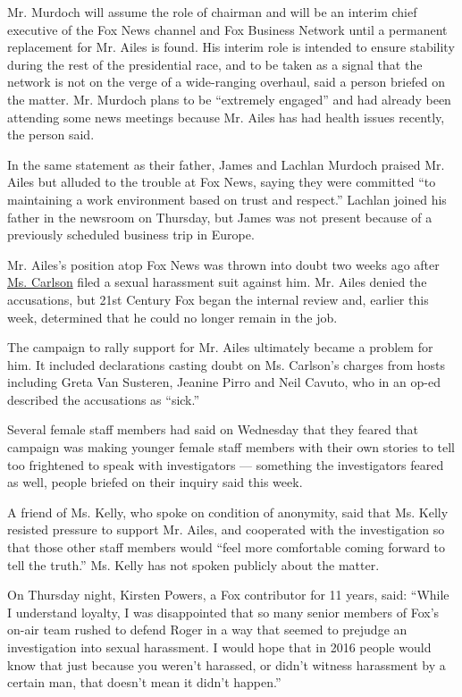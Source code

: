 Mr. Murdoch will assume the role of chairman and will be an interim
chief executive of the Fox News channel and Fox Business Network until a
permanent replacement for Mr. Ailes is found. His interim role is
intended to ensure stability during the rest of the presidential race,
and to be taken as a signal that the network is not on the verge of a
wide-ranging overhaul, said a person briefed on the matter. Mr. Murdoch
plans to be ``extremely engaged'' and had already been attending some
news meetings because Mr. Ailes has had health issues recently, the
person said.

In the same statement as their father, James and Lachlan Murdoch praised
Mr. Ailes but alluded to the trouble at Fox News, saying they were
committed ``to maintaining a work environment based on trust and
respect.'' Lachlan joined his father in the newsroom on Thursday, but
James was not present because of a previously scheduled business trip in
Europe.

Mr. Ailes's position atop Fox News was thrown into doubt two weeks ago
after
\href{http://www.nytimes3xbfgragh.onion/2016/07/13/business/media/gretchen-carlson-fox-news-interview.html}{Ms.
Carlson} filed a sexual harassment suit against him. Mr. Ailes denied
the accusations, but 21st Century Fox began the internal review and,
earlier this week, determined that he could no longer remain in the job.

The campaign to rally support for Mr. Ailes ultimately became a problem
for him. It included declarations casting doubt on Ms. Carlson's charges
from hosts including Greta Van Susteren, Jeanine Pirro and Neil Cavuto,
who in an op-ed described the accusations as ``sick.''

Several female staff members had said on Wednesday that they feared that
campaign was making younger female staff members with their own stories
to tell too frightened to speak with investigators --- something the
investigators feared as well, people briefed on their inquiry said this
week.

A friend of Ms. Kelly, who spoke on condition of anonymity, said that
Ms. Kelly resisted pressure to support Mr. Ailes, and cooperated with
the investigation so that those other staff members would ``feel more
comfortable coming forward to tell the truth.'' Ms. Kelly has not spoken
publicly about the matter.

On Thursday night, Kirsten Powers, a Fox contributor for 11 years, said:
``While I understand loyalty, I was disappointed that so many senior
members of Fox's on-air team rushed to defend Roger in a way that seemed
to prejudge an investigation into sexual harassment. I would hope that
in 2016 people would know that just because you weren't harassed, or
didn't witness harassment by a certain man, that doesn't mean it didn't
happen.''

